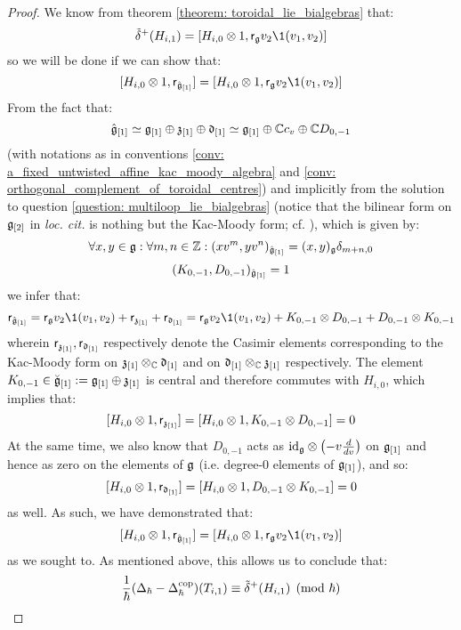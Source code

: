 \begin{proof}
                We know from theorem \ref{theorem: toroidal_lie_bialgebras} that:
                    $$\tilde{\delta}^+(H_{i, 1}) = [ H_{i, 0} \tensor 1, \sfr_{\g} v_2 \1(v_1, v_2) ]$$
                so we will be done if we can show that:
                    $$[H_{i, 0} \tensor 1, \sfr_{ \hat{\g}_{[1]} }] = [ H_{i, 0} \tensor 1, \sfr_{\g} v_2 \1(v_1, v_2) ]$$
                From the fact that:
                    $$\hat{\mathfrak{g}}_{[1]} \simeq \mathfrak{g}_{[1]} \oplus \mathfrak{z}_{[1]} \oplus \mathfrak{d}_{[1]} \simeq \mathfrak{g}_{[1]} \oplus \mathbb{C} c_v \oplus \mathbb{C} D_{0, -1}$$
                (with notations as in conventions \ref{conv: a_fixed_untwisted_affine_kac_moody_algebra} and \ref{conv: orthogonal_complement_of_toroidal_centres}) and implicitly from the solution to question \ref{question: multiloop_lie_bialgebras} (notice that the bilinear form on $\mathfrak{g}_{[2]}$ in \textit{loc. cit.} is nothing but the Kac-Moody form; cf. \cite[Chapter 7]{kac_infinite_dimensional_lie_algebras}), which is given by:
                    $$\forall x, y \in \mathfrak{g}: \forall m, n \in \mathbb{Z}: (x v^m, y v^n)_{\hat{\mathfrak{g}}_{[1]}} = (x, y)_{\mathfrak{g}} \delta_{m + n, 0}$$
                    $$(K_{0, -1}, D_{0, -1})_{\hat{\mathfrak{g}}_{[1]}} = 1$$
                we infer that:
                    $$\sfr_{ \hat{\g}_{[1]} } = \sfr_{\g} v_2 \1(v_1, v_2) + \sfr_{\z_{[1]}} + \sfr_{\d_{[1]}} = \sfr_{\g} v_2 \1(v_1, v_2) + K_{0, -1} \tensor D_{0, -1} + D_{0, -1} \tensor K_{0, -1}$$
                wherein $\mathsf{r}_{\mathfrak{z}_{[1]}}, \mathsf{r}_{\mathfrak{d}_{[1]}}$ respectively denote the Casimir elements corresponding to the Kac-Moody form on $\z_{[1]} \tensor_{\bbC} \d_{[1]}$ and on $\d_{[1]} \tensor_{\bbC} \z_{[1]}$ respectively. The element $K_{0, -1} \in \breve{\mathfrak{g}}_{[1]} := \mathfrak{g}_{[1]} \oplus \mathfrak{z}_{[1]}$ is central and therefore commutes with $H_{i, 0}$, which implies that:
                    $$[H_{i, 0} \tensor 1, \sfr_{\z_{[1]}}] = [H_{i, 0} \tensor 1, K_{0, -1} \tensor D_{0, -1}] = 0$$
                At the same time, we also know that $D_{0, -1}$ acts as $\id_{\g} \tensor \left(-v \frac{d}{dv}\right)$ on $\mathfrak{g}_{[1]}$ and hence as zero on the elements of $\mathfrak{g}$ (i.e. degree-$0$ elements of $\mathfrak{g}_{[1]}$), and so:
                    $$[H_{i, 0} \tensor 1, \sfr_{\d_{[1]}}] = [H_{i, 0} \tensor 1, D_{0, -1} \tensor K_{0, -1}] = 0$$
                as well. As such, we have demonstrated that:
                    $$[H_{i, 0} \tensor 1, \sfr_{ \hat{\g}_{[1]} }] = [ H_{i, 0} \tensor 1, \sfr_{\g} v_2 \1(v_1, v_2) ]$$
                as we sought to. As mentioned above, this allows us to conclude that:
                    $$\frac{1}{\hbar}( \Delta_{\hbar} - \Delta_{\hbar}^{\mathrm{cop}} )(T_{i, 1}) \equiv \tilde{\delta}^+(H_{i, 1}) \pmod{\hbar}$$
            \end{proof}